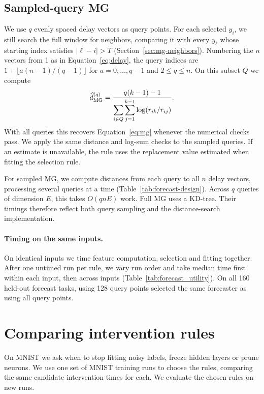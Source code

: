 {\subsection[Sampled-query MG]{Sampled-query MG}
We use $q$ evenly spaced delay vectors as query points. For each selected $y_i$, we still search the full window for neighbors, comparing it with every $y_\ell$ whose starting index satisfies $|\ell-i|>T$ (Section~\ref{sec:mg-neighbors}). Numbering the $n$ vectors from 1 as in Equation~\eqref{eq:delay}, the query indices are $1+\lfloor a(n-1)/(q-1)\rfloor$ for $a=0,\ldots,q-1$ and $2\le q\le n$. On this subset $Q$ we compute
\begin{equation}
\widehat d_{\rm MG}^{(q)}=
\frac{q(k-1)-1}{\displaystyle\sum_{i\in Q}\sum_{j=1}^{k-1}\log(r_{ik}/r_{ij})}.
\label{eq:querymg}
\end{equation}
With all queries this recovers Equation~\eqref{eq:mg} whenever the numerical checks pass. We apply the same distance and log-sum checks to the sampled queries. If an estimate is unavailable, the rule uses the replacement value estimated when fitting the selection rule.

For sampled MG, we compute distances from each query to all $n$ delay vectors, processing several queries at a time (Table~\ref{tab:forecast-design}). Across $q$ queries of dimension $E$, this takes $O(qnE)$ work. Full MG uses a KD-tree. Their timings therefore reflect both query sampling and the distance-search implementation.

\begin{table}[!htbp]
\centering\small
\caption{Forecast error and time to select and fit a model. NMSE is mean $\pm$ standard deviation across 20 repeats.}
\label{tab:forecast_utility}

\end{table}

\paragraph{Timing on the same inputs.}
On identical inputs we time feature computation, selection and fitting together. After one untimed run per rule, we vary run order and take median time first within each input, then across inputs (Table~\ref{tab:forecast_utility}).
On all 160 held-out forecast tasks, using 128 query points selected the same forecaster as using all query points.


\section{Comparing intervention rules}\label{app:intervention_utility}
On MNIST we ask when to stop fitting noisy labels, freeze hidden layers or prune neurons. We use one set of MNIST training runs to choose the rules, comparing the same candidate intervention times for each. We evaluate the chosen rules on new runs.

}
